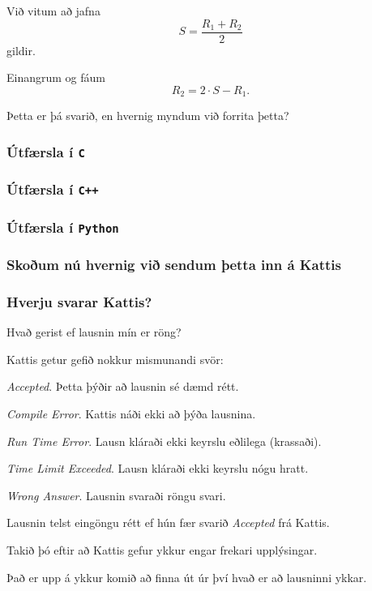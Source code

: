 {
	{
		\item<1-> Við vitum að jafna
		\[
			S = \frac{R_1 + R_2}{2}
		\]
		gildir.
		\item<2-> Einangrum og fáum
		\[
			R_2 = 2 \cdot S - R_1.
		\]
		\item<3-> Þetta er þá svarið, en hvernig myndum við forrita þetta?
	}
}

{
	\frametitle{Útfærsla í \texttt{C}}
}

{
	\frametitle{Útfærsla í \texttt{C++}}
}

{
	\frametitle{Útfærsla í \texttt{Python}}
}

{
	\frametitle{Skoðum nú hvernig við sendum þetta inn á Kattis}
}

{
	\frametitle{Hverju svarar Kattis?}
	{
		\item<1-> Hvað gerist ef lausnin mín er röng?
		\item<2-> Kattis getur gefið nokkur mismunandi svör:
		\item<3-> \emph{Accepted}. Þetta þýðir að lausnin sé dæmd rétt.
		\item<4-> \emph{Compile Error}. Kattis náði ekki að þýða lausnina.
		\item<5-> \emph{Run Time Error}. Lausn kláraði ekki keyrslu eðlilega (krassaði).
		\item<6-> \emph{Time Limit Exceeded}. Lausn kláraði ekki keyrslu nógu hratt.
		\item<7-> \emph{Wrong Answer}. Lausnin svaraði röngu svari.
		\item<8-> Lausnin telst eingöngu rétt ef hún fær svarið \emph{Accepted} frá Kattis.
	}
}

{
	{
		\item<1-> Takið þó eftir að Kattis gefur ykkur engar frekari upplýsingar.
		\item<2-> Það er upp á ykkur komið að finna út úr því hvað er að lausninni ykkar.
	}
}




